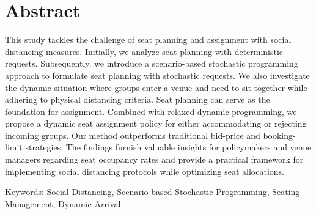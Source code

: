 
\section*{Abstract}
This study tackles the challenge of seat planning and assignment with social distancing measures. Initially, we analyze seat planning with deterministic requests. Subsequently, we introduce a scenario-based stochastic programming approach to formulate seat planning with stochastic requests. We also investigate the dynamic situation where groups enter a venue and need to sit together while adhering to physical distancing criteria. Seat planning can serve as the foundation for assignment. Combined with relaxed dynamic programming, we propose a dynamic seat assignment policy for either accommodating or rejecting incoming groups. Our method outperforms traditional bid-price and booking-limit strategies. The findings furnish valuable insights for policymakers and venue managers regarding seat occupancy rates and provide a practical framework for implementing social distancing protocols while optimizing seat allocations.


Keywords: Social Distancing, Scenario-based Stochastic Programming, Seating Management, Dynamic Arrival.


